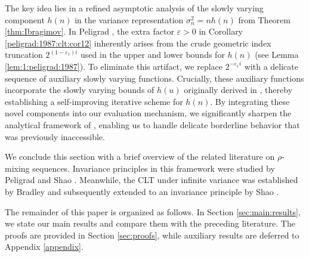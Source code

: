 \documentclass[11pt,a4,leqno]{amsart}
\newcommand{\vep}{\varepsilon}
\newcommand{\1}{{\mathbf 1}}
\begin{document}
The key idea lies in a refined asymptotic analysis of the slowly varying component 
$h(n)$ in the variance representation $\sigma_n^2 = n h(n)$ from Theorem \ref{thm:Ibragimov}. 
In Peligrad \cite{peligrad:1987}, the extra factor $\vep>0$ in Corollary \ref{peligrad:1987:clt:cor12} 
inherently arises from the crude geometric index truncation $2^{(1-\vep_1)i}$ used in the upper and lower 
bounds for $h(n)$ (see Lemma \ref{lem:1:peligrad:1987}). To eliminate this artifact, we replace $2^{-\vep_1 i}$ 
with a delicate sequence of auxiliary slowly varying functions. 
Crucially, these auxiliary functions incorporate the slowly varying bounds of $h(u)$ originally derived in \cite{peligrad:1987}, 
thereby establishing a self-improving iterative scheme for $h(n)$. 
By integrating these novel components into our evaluation mechanism, 
we significantly sharpen the analytical framework of \cite{peligrad:1987}, enabling us to handle delicate borderline behavior that was previously inaccessible.


We conclude this section with a brief overview of the related literature on $\rho$-mixing sequences. 
Invariance principles in this framework were studied by Peligrad \cite{peligrad:1982} and Shao \cite{shao:1988,shao:1989}. 
Meanwhile, the CLT under infinite variance was established by Bradley \cite{bradley:1988} and subsequently extended to 
an invariance principle by Shao \cite{shao:1993}.

The remainder of this paper is organized as follows. In Section \ref{sec:main:results}, 
we state our main results and compare them with the preceding literature. The proofs are provided 
in Section \ref{sec:proofs}, while auxiliary results are deferred to Appendix \ref{appendix}.
\end{document}
